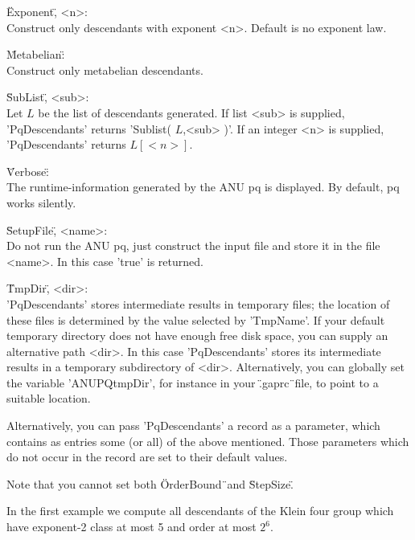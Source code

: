 \"Exponent\", <n>: \\
    Construct only descendants with exponent <n>.  Default is no exponent
    law.

\"Metabelian\": \\
    Construct only metabelian descendants.

\"SubList\", <sub>: \\
    Let $L$  be  the  list of  descendants  generated.  If  list <sub> is
    supplied,  'PqDescendants'  returns  'Sublist( $L$,<sub> )'.  If   an
    integer <n> is supplied, 'PqDescendants' returns $L[<n>]$.

\"Verbose\": \\
    The runtime-information  generated by  the  ANU pq is  displayed.  By
    default, pq works silently.

\"SetupFile\", <name>: \\
    Do not run the ANU pq, just construct  the input file and store it in
    the file <name>. In this case 'true' is returned.

\"TmpDir\", <dir>: \\
    'PqDescendants' stores intermediate results  in temporary  files; the
    location  of  these  files  is  determined  by the value  selected by
    'TmpName'.  If your default temporary directory does not  have enough
    free disk space,  you can supply an alternative path  <dir>.  In this
    case 'PqDescendants' stores its intermediate results  in  a temporary
    subdirectory of <dir>.
    Alternatively, you can globally set  the  variable 'ANUPQtmpDir', for
    instance in your \".gaprc\"\ file, to point to a suitable location.

Alternatively,  you can pass 'PqDescendants'  a record  as  a  parameter,
which  contains  as  entries some (or all) of the above mentioned.  Those
parameters  which do not occur  in  the record are  set  to their default
values.

Note that you cannot set both \"OrderBound\"\ and \"StepSize\".

In the first example  we  compute all descendants of the Klein four group
which have exponent-2 class at most 5 and order at most $2^6$.

